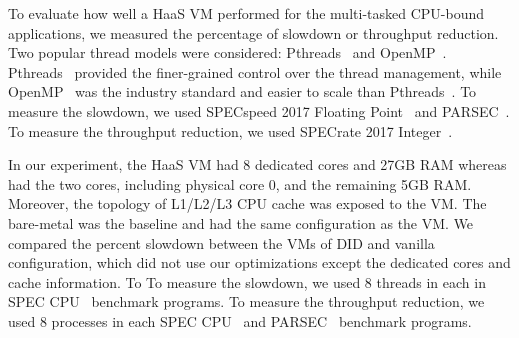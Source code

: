 



To evaluate how well a HaaS VM performed for the multi-tasked
CPU-bound applications, we measured the percentage of slowdown
or throughput reduction. Two popular thread models were
considered: Pthreads~\cite{lewis:1998} and
OpenMP~\cite{dagum:1998}. Pthreads~\cite{lewis:1998} provided
the finer-grained control over the thread management, while
OpenMP~\cite{dagum:1998} was the industry standard and easier
to scale than Pthreads~\cite{lewis:1998}. To measure the
slowdown, we used SPECspeed 2017 Floating
Point~\cite{bucek:2018} and PARSEC~\cite{lewis:1998}. To
measure the throughput reduction, we used SPECrate 2017
Integer~\cite{bucek:2018}.

In our experiment, the HaaS VM had 8 dedicated cores and 27GB
RAM whereas \na had the two cores, including physical core 0,
and the remaining 5GB RAM. Moreover, the topology of L1/L2/L3
CPU cache was exposed to the VM. The bare-metal was the
baseline and had the same configuration as the VM. We compared
the percent slowdown between the VMs of DID and vanilla
configuration, which did not use our optimizations except the
dedicated cores and cache information. To To measure the
slowdown, we used 8 threads in each in SPEC
CPU~\cite{bucek:2018} benchmark programs. To measure the
throughput reduction, we used 8 processes in each SPEC
CPU~\cite{bucek:2018} and PARSEC~\cite{lewis:1998} benchmark
programs.

